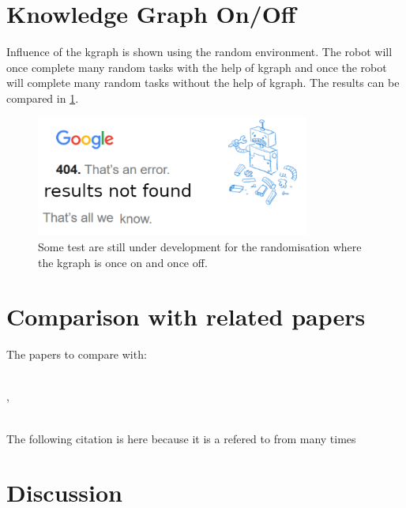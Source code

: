 
\section{Knowledge Graph On/Off}%
\label{sec:kgraph_on_off}
Influence of the \ac{kgraph} is shown using the random environment. The robot will once complete many random tasks with the help of \ac{kgraph} and once the robot will complete many random tasks without the help of \ac{kgraph}. The results can be compared in \cref{fig:results_random_kgraph_on_off}.\bs

\begin{figure}[H]
    \centering
    \includegraphics[width=9cm]{figures/tests/404_not_found}
    \caption{Some test are still under development for the randomisation where the kgraph is once on and once off.}%
    \label{fig:results_random_kgraph_on_off}
\end{figure}


\section{Comparison with related papers}%
\label{sec:compare_with_related_papers}

The papers to compare with:\newline

\\

\cite{sabbaghnovin_model_2021},


\\
\cite{novin_dynamic_2018}
The following \cite{novin_dynamic_2018} citation is here because it is a refered to from \cite{sabbaghnovin_model_2021} many times




\section{Discussion}%
\label{sec:discussion}
